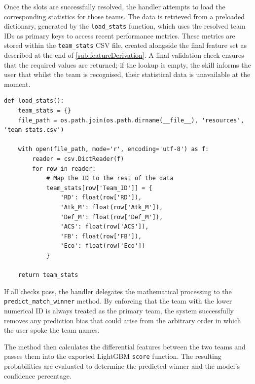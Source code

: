 Once the slots are successfully resolved, the handler attempts to load the corresponding statistics for those teams. The data is retrieved from a preloaded dictionary, generated by the \texttt{load\_stats} function, which uses the resolved team IDs as primary keys to access recent performance metrics. These metrics are stored within the \texttt{team_stats} CSV file, created alongside the final feature set as described at the end of \autoref{sub:featureDerivation}. A final validation check ensures that the required values are returned; if the lookup is empty, the skill informs the user that whilst the team is recognised, their statistical data is unavailable at the moment.

\begin{lstlisting}[style=code, caption={Function to load team statistics into memory using the Team ID as a key.}]
def load_stats():
    team_stats = {}
    file_path = os.path.join(os.path.dirname(__file__), 'resources', 'team_stats.csv')
    
    with open(file_path, mode='r', encoding='utf-8') as f:
        reader = csv.DictReader(f)
        for row in reader:
            # Map the ID to the rest of the data
            team_stats[row['Team_ID']] = {
                'RD': float(row['RD']),
                'Atk_M': float(row['Atk_M']),
                'Def_M': float(row['Def_M']),
                'ACS': float(row['ACS']),
                'FB': float(row['FB']),
                'Eco': float(row['Eco'])
            }

    return team_stats
\end{lstlisting}

If all checks pass, the handler delegates the mathematical processing to the \texttt{pred\-ict\_match\_winner} method. By enforcing that the team with the lower numerical ID is always treated as the primary team, the system successfully removes any prediction bias that could arise from the arbitrary order in which the user spoke the team names. 

The method then calculates the differential features between the two teams and passes them into the exported LightGBM \texttt{score} function. The resulting probabilities are evaluated to determine the predicted winner and the model's confidence percentage.

